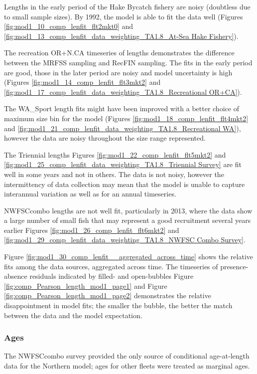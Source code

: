 \documentclass[12pt,]{article}
\begin{document}
Lengths in the early period of the Hake Bycatch fishery are noisy
(doubtless due to small sample sizes). By 1992, the model is able to fit
the data well (Figures \ref{fig:mod1_10_comp_lenfit_flt2mkt0} and
\ref{fig:mod1_13_comp_lenfit_data_weighting_TA1.8_At-Sea Hake Fishery}).

The recreation OR+N.CA timeseries of lengths demonstrates the difference
between the MRFSS sampling and RecFIN sampling. The fits in the early
period are good, those in the later period are noisy and model
uncertainty is high (Figures \ref{fig:mod1_14_comp_lenfit_flt3mkt2} and
\ref{fig:mod1_17_comp_lenfit_data_weighting_TA1.8_Recreational OR+CA}).

The WA\_Sport length fits might have been improved with a better choice
of maximum size bin for the model (Figures
\ref{fig:mod1_18_comp_lenfit_flt4mkt2} and
\ref{fig:mod1_21_comp_lenfit_data_weighting_TA1.8_Recreational WA}),
however the data are noisy throughout the size range represented.

The Triennial lengths Figures \ref{fig:mod1_22_comp_lenfit_flt5mkt2} and
\ref{fig:mod1_25_comp_lenfit_data_weighting_TA1.8_Triennial Survey} are
fit well in some years and not in others. The data is not noisy, however
the intermittency of data collection may mean that the model is unable
to capture interannual variation as well as for an annual timeseries.

NWFSCcombo lengths are not well fit, particularly in 2013, where the
data show a large number of small fish that may represent a good
recruitment several years earlier Figures
\ref{fig:mod1_26_comp_lenfit_flt6mkt2} and
\ref{fig:mod1_29_comp_lenfit_data_weighting_TA1.8_NWFSC Combo Survey}.

Figure \ref{fig:mod1_30_comp_lenfit__aggregated_across_time} shows the
relative fits among the data sources, aggregated across time. The
timeseries of presence-absence residuals indicated by filled- and
open-bubbles Figure \ref{fig:comp_Pearson_length_mod1_page1} and Figure
\ref{fig:comp_Pearson_length_mod1_page2} demonstrates the relative
disappointment in model fits; the smaller the bubble, the better the
match between the data and the model expectation.

\subsubsection{Ages}\label{ages}

The NWFSCcombo survey provided the only source of conditional
age-at-length data for the Northern model; ages for other fleets were
treated as marginal ages.
\end{document}
